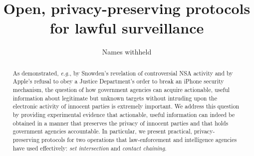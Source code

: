 \documentclass[USenglish,oneside,twocolumn]{article}
\begin{document}
 

  \author[1]{Names withheld}






  \title{\huge Open, privacy-preserving protocols for lawful surveillance}



  \begin{abstract}
{As demonstrated, {\it e.g.}, by Snowden's revelation of controversial NSA 
activity and by Apple's refusal to obey a Justice Department's order to break 
an iPhone security mechanism, the question of how government agencies can
acquire actionable, useful information about legitimate but unknown targets 
without intruding upon the electronic activity of innocent parties is 
extremely important.  We address this question by providing experimental
evidence that actionable, useful information can indeed be obtained in a manner
that preserves the privacy of innocent parties and that holds government
agencies accountable.  In particular, we present practical, privacy-preserving
protocols for two operations that law-enforcement and intelligence agencies
have used effectively: {\it set intersection} and {\it contact chaining}.}
  \end{abstract}



\maketitle







%
\end{document}
